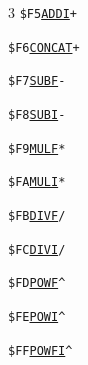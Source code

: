 \begin{multicols}{3}
\noindent\texttt{\$F5}\quad \hyperlink{l:ADDI}{\texttt{ADDI}}\hfill\texttt{+}\par
\noindent\texttt{\$F6}\quad \hyperlink{l:CONCAT}{\texttt{CONCAT}}\hfill\texttt{+}\par
\noindent\texttt{\$F7}\quad \hyperlink{l:SUBF}{\texttt{SUBF}}\hfill\texttt{-}\par
\noindent\texttt{\$F8}\quad \hyperlink{l:SUBI}{\texttt{SUBI}}\hfill\texttt{-}\par
\noindent\texttt{\$F9}\quad \hyperlink{l:MULF}{\texttt{MULF}}\hfill\texttt{*}\par
\noindent\texttt{\$FA}\quad \hyperlink{l:MULI}{\texttt{MULI}}\hfill\texttt{*}\par
\noindent\texttt{\$FB}\quad \hyperlink{l:DIVF}{\texttt{DIVF}}\hfill\texttt{/}\par
\noindent\texttt{\$FC}\quad \hyperlink{l:DIVI}{\texttt{DIVI}}\hfill\texttt{/}\par
\noindent\texttt{\$FD}\quad \hyperlink{l:POWF}{\texttt{POWF}}\hfill\texttt{\^{}}\par
\noindent\texttt{\$FE}\quad \hyperlink{l:POWI}{\texttt{POWI}}\hfill\texttt{\^{}}\par
\noindent\texttt{\$FF}\quad \hyperlink{l:POWFI}{\texttt{POWFI}}\hfill\texttt{\^{}}\par
\end{multicols}
